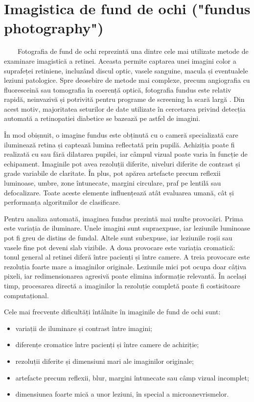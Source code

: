 \documentclass[12pt, a4paper, oneside, romanian]{teza-upb}
\begin{document}
\section{Imagistica de fund de ochi ("fundus photography")}

\ \ \ \ Fotografia de fund de ochi reprezintă una dintre cele mai utilizate metode de examinare imagistică a retinei. Aceasta permite captarea unei imagini color a suprafeței retiniene, incluzând discul optic, vasele sanguine, macula și eventualele leziuni patologice. Spre deosebire de metode mai complexe, precum angiografia cu fluoresceină sau tomografia în coerență optică, fotografia fundus este relativ rapidă, neinvazivă și potrivită pentru programe de screening la scară largă \cite{3_gulshan2016development}. Din acest motiv, majoritatea seturilor de date utilizate în cercetarea privind detecția automată a retinopatiei diabetice se bazează pe astfel de imagini.
\bigskip

În mod obișnuit, o imagine fundus este obținută cu o cameră specializată care iluminează retina și captează lumina reflectată prin pupilă. Achiziția poate fi realizată cu sau fără dilatarea pupilei, iar câmpul vizual poate varia în funcție de echipament. Imaginile pot avea rezoluții diferite, niveluri diferite de contrast și grade variabile de claritate. În plus, pot apărea artefacte precum reflexii luminoase, umbre, zone întunecate, margini circulare, praf pe lentilă sau defocalizare. Toate aceste elemente influențează atât evaluarea umană, cât și performanța algoritmilor de clasificare.
\bigskip

Pentru analiza automată, imaginea fundus prezintă mai multe provocări. Prima este variația de iluminare. Unele imagini sunt supraexpuse, iar leziunile luminoase pot fi greu de distins de fundal. Altele sunt subexpuse, iar leziunile roșii sau vasele fine pot deveni slab vizibile. A doua provocare este variația cromatică: tonul general al retinei diferă între pacienți și între camere. A treia provocare este rezoluția foarte mare a imaginilor originale. Leziunile mici pot ocupa doar câțiva pixeli, iar redimensionarea agresivă poate elimina informație relevantă. În același timp, procesarea directă a imaginilor la rezoluție completă poate fi costisitoare computațional.
\bigskip

Cele mai frecvente dificultăți întâlnite în imaginile de fund de ochi sunt:

\begin{itemize}
  \item variații de iluminare și contrast între imagini;
  \item diferențe cromatice între pacienți și între camere de achiziție;
  \item rezoluții diferite și dimensiuni mari ale imaginilor originale;
  \item artefacte precum reflexii, blur, margini întunecate sau câmp vizual incomplet;
  \item dimensiunea foarte mică a unor leziuni, în special a microanevrismelor.
\end{itemize}
\end{document}
